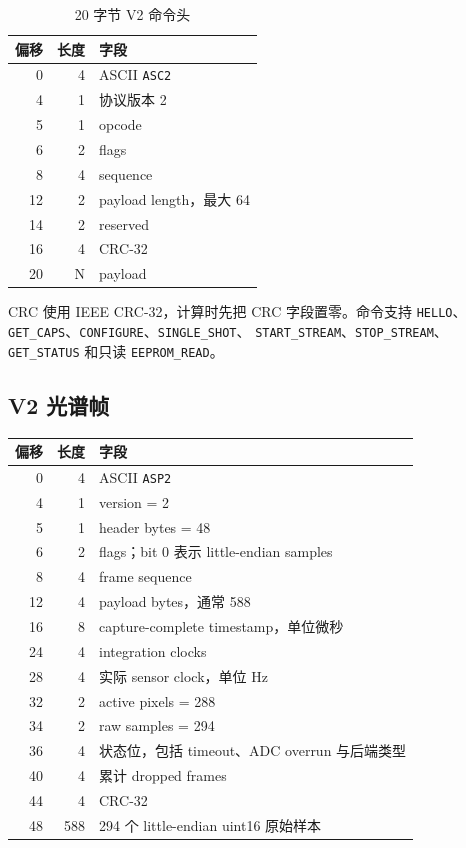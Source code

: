 \documentclass[UTF8,fontset=windows,11pt]{ctexart}
\newcommand{\code}[1]{\texttt{#1}}
\begin{document}
\begin{table}[htbp]
\centering
\caption{20 字节 V2 命令头}
\begin{tabular}{rrl}
\toprule
偏移 & 长度 & 字段\\
\midrule
0 & 4 & ASCII \code{ASC2}\\
4 & 1 & 协议版本 2\\
5 & 1 & opcode\\
6 & 2 & flags\\
8 & 4 & sequence\\
12 & 2 & payload length，最大 64\\
14 & 2 & reserved\\
16 & 4 & CRC-32\\
20 & N & payload\\
\bottomrule
\end{tabular}
\end{table}

CRC 使用 IEEE CRC-32，计算时先把 CRC 字段置零。命令支持
\code{HELLO}、\code{GET\_CAPS}、\code{CONFIGURE}、\code{SINGLE\_SHOT}、
\code{START\_STREAM}、\code{STOP\_STREAM}、\code{GET\_STATUS} 和只读
\code{EEPROM\_READ}。

\subsection{V2 光谱帧}

\begin{longtable}{rrp{}}
\toprule
偏移 & 长度 & 字段\\
\midrule
\endhead
0 & 4 & ASCII \code{ASP2}\\
4 & 1 & version = 2\\
5 & 1 & header bytes = 48\\
6 & 2 & flags；bit 0 表示 little-endian samples\\
8 & 4 & frame sequence\\
12 & 4 & payload bytes，通常 588\\
16 & 8 & capture-complete timestamp，单位微秒\\
24 & 4 & integration clocks\\
28 & 4 & 实际 sensor clock，单位 Hz\\
32 & 2 & active pixels = 288\\
34 & 2 & raw samples = 294\\
36 & 4 & 状态位，包括 timeout、ADC overrun 与后端类型\\
40 & 4 & 累计 dropped frames\\
44 & 4 & CRC-32\\
48 & 588 & 294 个 little-endian uint16 原始样本\\
\bottomrule
\end{longtable}
\end{document}
